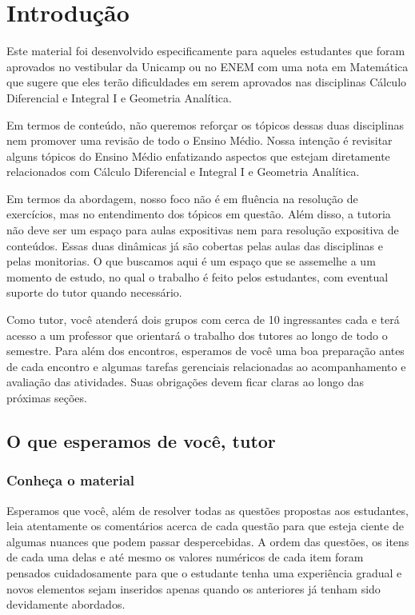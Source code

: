 

\chapter{Introdução}

\paraTutores

Este material foi desenvolvido especificamente para aqueles estudantes que foram aprovados no vestibular da Unicamp ou no ENEM com uma nota em Matemática que sugere que eles terão dificuldades em serem aprovados nas disciplinas Cálculo Diferencial e Integral I e Geometria Analítica.

Em termos de conteúdo, não queremos reforçar os tópicos dessas duas disciplinas nem promover uma revisão de todo o Ensino Médio. Nossa intenção é revisitar alguns tópicos do Ensino Médio enfatizando aspectos que estejam diretamente relacionados com Cálculo Diferencial e Integral I e Geometria Analítica.

Em termos da abordagem, nosso foco não é em fluência na resolução de exercícios, mas no entendimento dos tópicos em questão. Além disso, a tutoria não deve ser um espaço para aulas expositivas nem para resolução expositiva de conteúdos. Essas duas dinâmicas já são cobertas pelas aulas das disciplinas e pelas monitorias. O que buscamos aqui é um espaço que se assemelhe a um momento de estudo, no qual o trabalho é feito pelos estudantes, com eventual suporte do tutor quando necessário.

Como tutor, você atenderá dois grupos com cerca de 10 ingressantes cada e terá acesso a um professor que orientará o trabalho dos tutores ao longo de todo o semestre. Para além dos encontros, esperamos de você uma boa preparação antes de cada encontro e algumas tarefas gerenciais relacionadas ao acompanhamento e avaliação das atividades. Suas obrigações devem ficar claras ao longo das próximas seções.

\newpage
\section{O que esperamos de você, tutor}

\subsection{Conheça o material}

Esperamos que você, além de resolver todas as questões propostas aos estudantes, leia atentamente os comentários acerca de cada questão para que esteja ciente de algumas nuances que podem passar despercebidas. A ordem das questões, os itens de cada uma delas e até mesmo os valores numéricos de cada item foram pensados cuidadosamente para que o estudante tenha uma experiência gradual e novos elementos sejam inseridos apenas quando os anteriores já tenham sido devidamente abordados.

